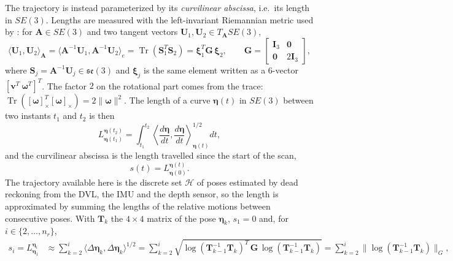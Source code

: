 The trajectory is instead parameterized by its \emph{curvilinear abscissa}, i.e.\ its length in
$SE(3)$. Lengths are measured with the left-invariant Riemannian metric used by
\citet{breux2020elevation}: for $\mathbf{A} \in SE(3)$ and two tangent vectors
$\mathbf{U}_1, \mathbf{U}_2 \in T_{\mathbf{A}}SE(3)$,
\begin{equation}                         %
  \langle \mathbf{U}_1, \mathbf{U}_2 \rangle_{\mathbf{A}}
  = \langle \mathbf{A}^{-1}\mathbf{U}_1, \mathbf{A}^{-1}\mathbf{U}_2 \rangle_e
  = \operatorname{Tr}(\mathbf{S}_1^T \mathbf{S}_2)
  = \boldsymbol{\xi}_1^T \mathbf{G}\, \boldsymbol{\xi}_2, \qquad
  \mathbf{G} = \begin{bmatrix} \mathbf{I}_3 & \mathbf{0} \\ \mathbf{0} & 2\mathbf{I}_3 \end{bmatrix},
  \label{eq:msis_metric}
\end{equation}
where $\mathbf{S}_j = \mathbf{A}^{-1}\mathbf{U}_j \in \mathfrak{se}(3)$ and $\boldsymbol{\xi}_j$ is
the same element written as a 6-vector $[\mathbf{v}^T\ \boldsymbol{\omega}^T]^T$. The factor $2$ on
the rotational part comes from the trace:
$\operatorname{Tr}([\boldsymbol{\omega}]_\times^T[\boldsymbol{\omega}]_\times) = 2\lVert\boldsymbol{\omega}\rVert^2$.
The length of a curve $\boldsymbol{\eta}(t)$ in $SE(3)$ between two instants $t_1$ and $t_2$ is then
\begin{equation}                         %
  L_{\boldsymbol{\eta}(t_1)}^{\boldsymbol{\eta}(t_2)} = \int_{t_1}^{t_2}
  \left\langle \frac{d\boldsymbol{\eta}}{dt}, \frac{d\boldsymbol{\eta}}{dt} \right\rangle_{\boldsymbol{\eta}(t)}^{1/2} dt,
  \label{eq:msis_length}
\end{equation}
and the curvilinear abscissa is the length travelled since the start of the scan,
\begin{equation}                         %
  s(t) = L_{\boldsymbol{\eta}(0)}^{\boldsymbol{\eta}(t)}.
  \label{eq:msis_abscissa_cont}
\end{equation}
The trajectory available here is the discrete set $\mathcal{H}$ of poses estimated by dead reckoning
from the DVL, the IMU and the depth sensor, so the length is approximated by summing the lengths of
the relative motions between consecutive poses. With $\mathbf{T}_k$ the $4\times4$ matrix of the pose
$\boldsymbol{\eta}_k$, $s_1 = 0$ and, for $i \in \{2,\dots,n_r\}$,
\begin{equation}                         %
  \begin{aligned}
    s_i = L_{\boldsymbol{\eta}_1}^{\boldsymbol{\eta}_i}
    &\approx \sum_{k=2}^{i} \langle \Delta\boldsymbol{\eta}_k, \Delta\boldsymbol{\eta}_k \rangle^{1/2}
     = \sum_{k=2}^{i} \sqrt{\log(\mathbf{T}_{k-1}^{-1}\mathbf{T}_k)^T\, \mathbf{G}\,
       \log(\mathbf{T}_{k-1}^{-1}\mathbf{T}_k)}
     = \sum_{k=2}^{i} \big\lVert \log(\mathbf{T}_{k-1}^{-1}\mathbf{T}_k) \big\rVert_G,
  \end{aligned}
  \label{eq:msis_abscissa}
\end{equation}
